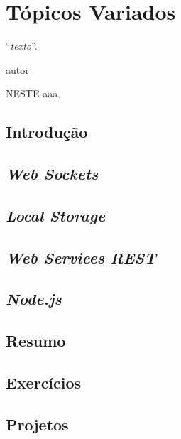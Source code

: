 \chapter{Tópicos Variados}\label{cap:topicosVariados}
\epigraph{``\textit{texto}''.}{autor}

\lettrine[lines=4, lhang=0.1, lraise=0, loversize=0.2, findent=0.1em]{\textcolor{corAzulTema}{N}}{ESTE} aaa.

\section{Introdução}

\section{\textit{Web Sockets}}

\section{\textit{Local Storage}}

\section{\textit{Web Services REST}}

\section{\textit{Node.js}}

\section{Resumo}

\section{Exercícios}

\section{Projetos}
